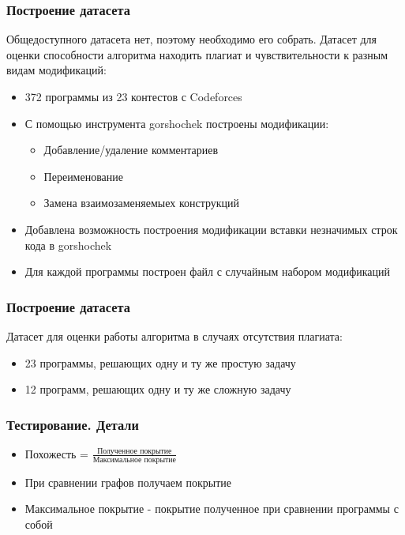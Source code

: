 \documentclass[10pt]{beamer}
\begin{document}
\begin{frame}\frametitle{Построение датасета}
	Общедоступного датасета нет, поэтому необходимо его собрать.
	\newline
	\newline
	Датасет для оценки способности алгоритма находить плагиат и чувствительности к разным видам модификаций:
	\begin{itemize}
		\item 372 программы из 23 контестов с Codeforces
		\item С помощью инструмента gorshochek построены модификации:
		\begin{itemize} 
			\item Добавление/удаление комментариев
			\item Переименование
			\item Замена взаимозаменяемыех конструкций
		\end{itemize}
		\item Добавлена возможность построения модификации вставки незначимых строк кода в gorshochek
		\item Для каждой программы построен файл с случайным набором модификаций
	\end{itemize}
	
\end{frame}

\begin{frame}\frametitle{Построение датасета}
	Датасет для оценки работы алгоритма в случаях отсутствия плагиата:
	\begin{itemize}
		\item 23 программы, решающих одну и ту же простую задачу
		\item 12 программ, решающих одну и ту же сложную задачу
	\end{itemize}
	
\end{frame}

\begin{frame}\frametitle{Тестирование. Детали}
	\begin{itemize}
		\item Похожесть = $\frac{\text{Полученное покрытие}}{\text{Максимальное покрытие}}$
		\item При сравнении графов получаем покрытие
		\item Максимальное покрытие - покрытие полученное при сравнении программы с собой
	\end{itemize}
    
\end{frame}
\end{document}
